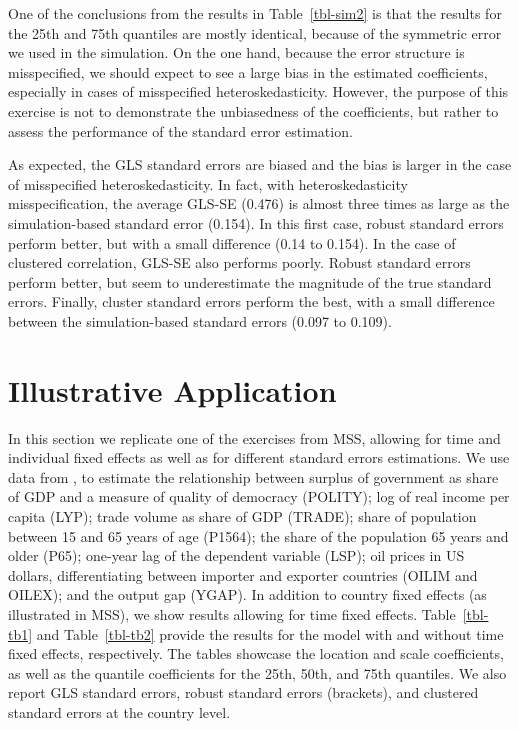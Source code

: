 \documentclass[
  authoryear,
  review,
  1p]{elsarticle}
\begin{document}
One of the conclusions from the results in Table~\ref{tbl-sim2} is that
the results for the 25th and 75th quantiles are mostly identical,
because of the symmetric error we used in the simulation. On the one
hand, because the error structure is misspecified, we should expect to
see a large bias in the estimated coefficients, especially in cases of
misspecified heteroskedasticity. However, the purpose of this exercise
is not to demonstrate the unbiasedness of the coefficients, but rather
to assess the performance of the standard error estimation.

As expected, the GLS standard errors are biased and the bias is larger
in the case of misspecified heteroskedasticity. In fact, with
heteroskedasticity misspecification, the average GLS-SE (0.476) is almost
three times as large as the simulation-based standard error (0.154). In
this first case, robust standard errors perform better, but with a small
difference (0.14 to 0.154). In the case of clustered correlation, GLS-SE
also performs poorly. Robust standard errors perform better, but seem to
underestimate the magnitude of the true standard errors. Finally,
cluster standard errors perform the best, with a small difference
between the simulation-based standard errors (0.097 to 0.109).

\hypertarget{illustrative-application}{%
\section{Illustrative Application}\label{illustrative-application}}

In this section we replicate one of the exercises from MSS, allowing
for time and individual fixed effects as well as for different standard
errors estimations. We use data from \citet{persson_economic_2005}, to
estimate the relationship between surplus of government as share of GDP
and a measure of quality of democracy (POLITY); log of real income per
capita (LYP); trade volume as share of GDP (TRADE); share of population
between 15 and 65 years of age (P1564); the share of the population 65 years
and older (P65); one-year lag of the dependent variable (LSP); oil prices
in US dollars, differentiating between importer and exporter countries (OILIM and
OILEX); and the output gap (YGAP). In addition to country fixed effects
(as illustrated in MSS), we show results allowing for time fixed
effects. Table~\ref{tbl-tb1} and Table~\ref{tbl-tb2} provide the results
for the model with and without time fixed effects, respectively. The tables showcase the location and scale coefficients, as well as the quantile
coefficients for the 25th, 50th, and 75th quantiles. We also report
GLS standard errors, robust standard errors (brackets), and clustered
standard errors at the country level.
\end{document}
